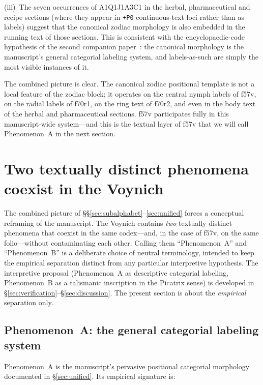 \noindent (iii)~The seven occurrences of A1Q1J1A3C1 in the herbal,
pharmaceutical and recipe sections (where they appear in
\texttt{+P0} continuous-text loci rather than as labels) suggest that
the canonical zodiac morphology is also embedded in the running text
of those sections. This is consistent with the encyclopaedic-code
hypothesis of the second companion paper~\citep{jimenez2026twotier}:
the canonical morphology is the manuscript's general categorial
labeling system, and labels-as-such are simply the most visible
instances of it.

The combined picture is clear. The canonical zodiac positional template
is not a local feature of the zodiac block; it operates on the central
nymph labels of f57v, on the radial labels of f70r1, on the ring text
of f70r2, and even in the body text of the herbal and pharmaceutical
sections. f57v participates fully in this manuscript-wide system---and
this is the textual layer of f57v that we will call Phenomenon~A in
the next section.


\section{Two textually distinct phenomena coexist in the Voynich}
\label{sec:two_phenomena}

The combined picture of \S\S\ref{sec:subalphabet}--\ref{sec:unified} forces a
conceptual reframing of the manuscript. The Voynich contains \emph{two}
textually distinct phenomena that coexist in the same codex---and, in the
case of f57v, on the same folio---without contaminating each other. Calling
them ``Phenomenon~A'' and ``Phenomenon~B'' is a deliberate choice of neutral
terminology, intended to keep the empirical separation distinct from any
particular interpretive hypothesis. The interpretive proposal (Phenomenon~A
as descriptive categorial labeling, Phenomenon~B as a talismanic
inscription in the Picatrix sense) is developed in
\S\ref{sec:verification}--\S\ref{sec:discussion}. The present section is
about the \emph{empirical} separation only.

\subsection{Phenomenon~A: the general categorial labeling system}
\label{sec:phenomenonA}

Phenomenon~A is the manuscript's pervasive positional categorial morphology
documented in \S\ref{sec:unified}. Its empirical signature is:

